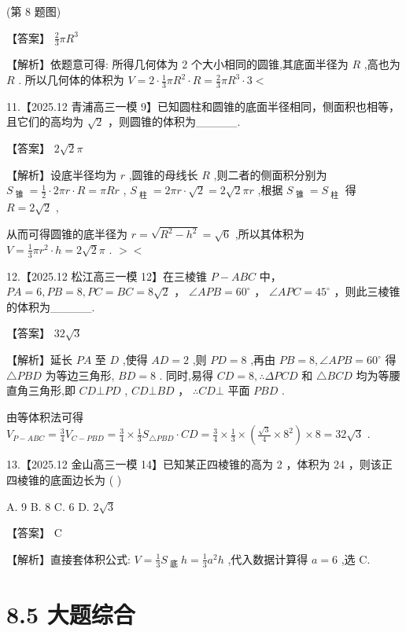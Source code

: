 \documentclass[10pt]{article}
\begin{document}
(第 8 题图)

【答案】 \(\frac{2}{3}\pi {R}^{3}\)

【解析】依题意可得: 所得几何体为 2 个大小相同的圆锥,其底面半径为 \(R\) ,高也为 \(R\) . 所以几何体的体积为 \(V = 2 \cdot  \frac{1}{3}\pi {R}^{2} \cdot  R = \frac{2}{3}\pi {R}^{3} \cdot  3 <\)

11.【2025.12 青浦高三一模 9】已知圆柱和圆锥的底面半径相同，侧面积也相等，且它们的高均为 \(\sqrt{2}\) ，则圆锥的体积为\_\_\_\_\_.

【答案】 \(2\sqrt{2}\pi\)

【解析】设底半径均为 \(r\) ,圆锥的母线长 \(R\) ,则二者的侧面积分别为 \({S}_{\text{ 锥 }} = \frac{1}{2} \cdot  {2\pi r} \cdot  R = {\pi Rr}\) , \({S}_{\text{ 柱 }} = {2\pi r} \cdot  \sqrt{2} = 2\sqrt{2}{\pi r}\) ,根据 \({S}_{\text{ 锥 }} = {S}_{\text{ 柱 }}\) 得 \(R = 2\sqrt{2}\) ,

从而可得圆锥的底半径为 \(r = \sqrt{{R}^{2} - {h}^{2}} = \sqrt{6}\) ,所以其体积为 \(V = \frac{1}{3}\pi {r}^{2} \cdot  h = 2\sqrt{2}\pi\) . \(>  <\)

12.【2025.12 松江高三一模 12】在三棱锥 \(P - {ABC}\) 中， \({PA} = 6,{PB} = 8,{PC} = {BC} = 8\sqrt{2}\) ， \(\angle {APB} = {60}^{ \circ  }\) ， \(\angle {APC} = {45}^{ \circ  }\) ，则此三棱锥的体积为\_\_\_\_\_.

【答案】 \({32}\sqrt{3}\)

【解析】延长 \({PA}\) 至 \(D\) ,使得 \({AD} = 2\) ,则 \({PD} = 8\) ,再由 \({PB} = 8,\angle {APB} = {60}^{ \circ  }\) 得 \(\bigtriangleup {PBD}\) 为等边三角形, \({BD} = 8\) . 同时,易得 \({CD} = 8,\therefore {\Delta PCD}\) 和 \(\bigtriangleup {BCD}\) 均为等腰直角三角形,即 \({CD} \bot  {PD}\) , \({CD} \bot  {BD}\) ， \(\therefore {CD} \bot\) 平面 \({PBD}\) .

由等体积法可得 \({V}_{P - {ABC}} = \frac{3}{4}{V}_{C - {PBD}} = \frac{3}{4} \times  \frac{1}{3}{S}_{\bigtriangleup {PBD}} \cdot  {CD} = \frac{3}{4} \times  \frac{1}{3} \times  \left( {\frac{\sqrt{3}}{4} \times  {8}^{2}}\right)  \times  8 = {32}\sqrt{3}\) .

13.【2025.12 金山高三一模 14】已知某正四棱锥的高为 2 ，体积为 24 ，则该正四棱锥的底面边长为 ( )

A. 9 B. 8 C. 6 D. \(2\sqrt{3}\)

【答案】 \(\mathrm{C}\)

【解析】直接套体积公式: \(V = \frac{1}{3}{S}_{\text{ 底 }}h = \frac{1}{3}{a}^{2}h\) ,代入数据计算得 \(a = 6\) ,选 C.

\section*{8.5 大题综合}
\end{document}
